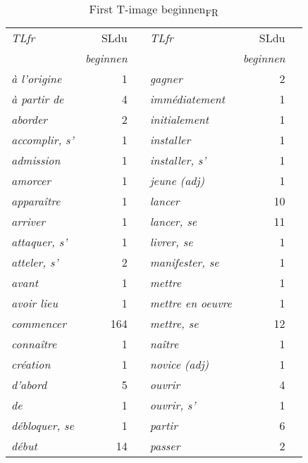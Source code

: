 \begin{table}\small
\caption{First T-image beginnen\textsubscript{FR}}
\begin{tabularx}{\textwidth}{>{\itshape}lrX>{\itshape}lrr}\lsptoprule
\normalfont TLfr & SLdu  &     & \normalfont TLfr  & SLdu\\\cmidrule(lr){2-2}\cmidrule(lr){5-5}
& \itshape beginnen   &   & & \itshape beginnen\\\midrule
à l'origine &  1                     & & gagner &  2\\
à partir de &  4                          & & immédiatement &  1\\
aborder &  2                              & & initialement &  1\\
accomplir, s' &  1                        & & installer &  1\\
admission &  1                            & & installer, s' &  1\\
amorcer &  1                              & & jeune (adj) &  1\\
apparaître &  1                           & & lancer &  10\\
arriver &  1                              & & lancer, se &  11\\
attaquer, s' &  1                         & & livrer, se &  1\\
atteler, s' &  2                          & & manifester, se &  1\\
avant &  1                                & & mettre &  1\\
avoir lieu &  1                           & & mettre en oeuvre &  1\\
commencer &  164                          & & mettre, se &  12\\
connaître &  1                            & & naître &  1\\
création &  1                             & & novice (adj) &  1\\
d'abord &  5                              & & ouvrir &  4\\
de &  1                                   & & ouvrir, s' &  1\\
débloquer, se &  1                        & & partir &  6\\
début &  14                               & & passer &  2\\

\end{tabularx}
\end{table}

